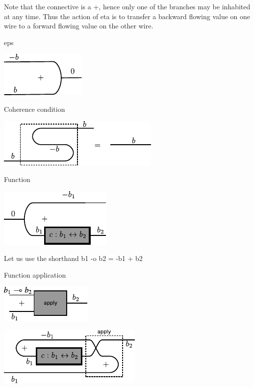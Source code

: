 \documentclass[preprint]{sigplanconf}
\begin{document}
Note that the connective is a {{+}}, hence only one of the branches
may be inhabited at any time. Thus the action of {{eta}} is to
transfer a backward flowing value on one wire to a forward flowing
value on the other wire.

{{eps}}

\begin{center}
  \includegraphics{diagrams/eps.pdf}
\end{center}

Coherence condition

\begin{center}
  \includegraphics{diagrams/coherence.pdf}
\end{center}

Function

\begin{center}
  \includegraphics{diagrams/function.pdf}
\end{center}

Let us use the shorthand {{b1 -o b2 = -b1 + b2}}

Function application

\begin{center}
  \includegraphics{diagrams/apply1.pdf}
\end{center}

\begin{center}
  \includegraphics{diagrams/apply2.pdf}
\end{center}
\end{document}

